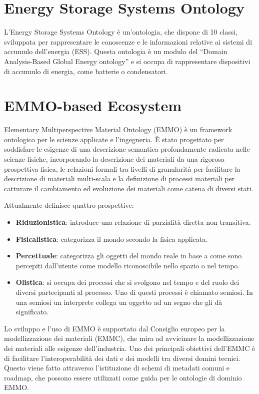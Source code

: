 \section{Energy Storage Systems Ontology}
L'Energy Storage Systems Ontology \cite{EnergyStorageSystemOntology} è
un'ontologia, che dispone di 10 classi, sviluppata per
rappresentare le conoscenze e le informazioni relative ai sistemi di accumulo
dell'energia (ESS). Questa ontologia è un modulo del “Domain Analysis-Based
Global Energy ontology” e si occupa di rappresentare dispositivi di accumulo di
energia, come batterie o condensatori.

\section{EMMO-based Ecosystem}
Elementary Multiperspective Material Ontology (EMMO) \cite{emmo} è un
framework ontologico per le
scienze applicate e l'ingegneria. È stato progettato per soddisfare le esigenze
di una descrizione semantica profondamente radicata nelle scienze fisiche,
incorporando la descrizione dei materiali da una rigorosa prospettiva fisica,
le relazioni formali tra livelli di granularità per facilitare la descrizione
di materiali multi-scala e la definizione di processi materiali per catturare
il cambiamento ed evoluzione dei materiali come catena di diversi stati.

Attualmente definisce quattro prospettive:
\begin{itemize}
      \item \textbf{Riduzionistica}: introduce una relazione di
            parzialità diretta non transitiva.
      \item \textbf{Fisicalistica}: categorizza il mondo
            secondo la fisica applicata.
      \item \textbf{Percettuale}: categorizza gli oggetti del mondo reale in base
            a come sono percepiti dall'utente come modello riconoscibile nello
            spazio o nel tempo.
      \item \textbf{Olistica}: si occupa dei processi che si svolgono nel tempo e
            del ruolo dei diversi partecipanti al processo. Uno di questi
            processi è
            chiamato semiosi. In una semiosi un interprete collega un oggetto ad
            un segno
            che gli dà significato.
\end{itemize}

Lo sviluppo e l'uso di EMMO è supportato dal Consiglio europeo per la
modellizzazione dei materiali (EMMC), che mira ad avvicinare la modellizzazione
dei materiali alle esigenze dell'industria. Uno dei principali obiettivi
dell'EMMC è di facilitare l'interoperabilità dei dati e dei modelli tra diversi
domini tecnici. Questo viene fatto attraverso l'istituzione di schemi di
metadati comuni e roadmap, che possono essere utilizzati come guida per le
ontologie di dominio EMMO.

